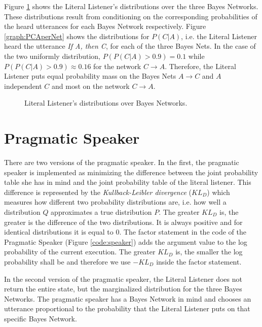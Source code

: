 Figure \ref{fig:LL-BN} shows the Literal Listener's distributions over the three Bayes Networks. These distributions result from conditioning on the corresponding probabilities of the heard utterances for each Bayes Network respectively. Figure \ref{graph:PCAperNet} shows the distributions for $P(C|A)$, i.e. the Literal Listener heard the utterance \textit{If A, then C}, for each of the three Bayes Nets. In the case of the two uniformly distribution, $P(P(C|A)>0.9)=0.1$ while $P(P(C|A)>0.9) \approx 0.16$ for the network $C \rightarrow A$. Therefore, the Literal Listener puts equal probability mass on the Bayes Nets $A \rightarrow C$ and $A$ independent $C$ and most on the network $C \rightarrow A$.


\begin{figure}[ht]
\centering
{}\qquad
{}

\qquad
{}

\caption{Literal Listener's distributions over Bayes Networks.}
\label{fig:LL-BN}
\end{figure}


\FloatBarrier
\section*{Pragmatic Speaker}

There are two versions of the pragmatic speaker. In the first, the pragmatic speaker is implemented as minimizing the difference between the joint probability table she has in mind and the joint probability table of the literal listener. This difference is represented by the \textit{Kullback-Leibler divergence} ($KL_D$) which measures how different two probability distributions are, i.e. how well a distribution $Q$ approximates a true distribution $P$. The greater $KL_D$ is, the greater is the difference of the two distributions. It is always positive and for identical distributions it is equal to 0. The factor statement in the code of the Pragmatic Speaker (Figure \ref{code:speaker}) adds the argument value to the log probability of the current execution. The greater $KL_D$ is, the smaller the log probability shall be and therefore we use $-KL_D$ inside the factor statement.

In the second version of the pragmatic speaker, the Literal Listener does not return the entire state, but the marginalized distribution for the three Bayes Networks. The pragmatic speaker has a Bayes Network in mind and chooses an utterance proportional to the probability that the Literal Listener puts on that specific Bayes Network. 


